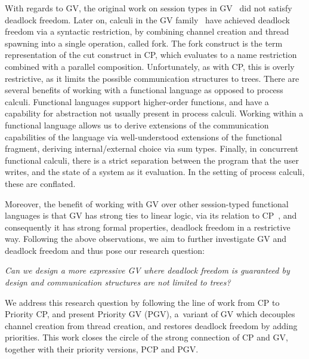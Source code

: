 \documentclass[main.tex]{subfiles}
\begin{document}
With regards to GV, the original work on session types in GV~\cite{gayvasconcelos10,gayvasconcelos12} did not satisfy deadlock freedom. Later on, calculi in the GV family~\cite{wadler15,lindleymorris15} have achieved deadlock freedom via a syntactic restriction, \ie by combining channel creation and thread spawning into a single operation, called fork. The fork construct is the term representation of the cut construct in CP, which evaluates to a name restriction combined with a parallel composition. Unfortunately, as with CP, this is overly restrictive, as it limits the possible communication structures to trees. There are several benefits of working with a functional language as opposed to process calculi. Functional languages support higher-order functions, and have a capability for abstraction not usually present in process calculi. Working within a functional language allows us to derive extensions of the communication capabilities of the language via well-understood extensions of the functional fragment, \ie deriving internal/external choice via sum types. Finally, in concurrent functional calculi, there is a strict separation between the program that the user writes, and the state of a system as it evaluation. In the setting of process calculi, these are conflated.

Moreover, the benefit of working with GV over other session-typed functional languages is that GV has strong ties to linear logic, via its relation to CP~\cite{wadler12}, and consequently it has strong formal properties, \eg deadlock freedom in a restrictive way.
Following the above observations, we aim to further investigate GV and deadlock freedom and thus pose our research question:

\emph{Can we design a more expressive GV where deadlock freedom is guaranteed by design and communication structures are not limited to trees?}

We address this research question by following the line of work from CP to Priority CP, and present
Priority GV (PGV), a~variant of GV which decouples channel creation from thread creation, and restores deadlock freedom by adding priorities. This work closes the circle of the strong connection of CP and GV, together with their priority versions, PCP and PGV.
\end{document}

